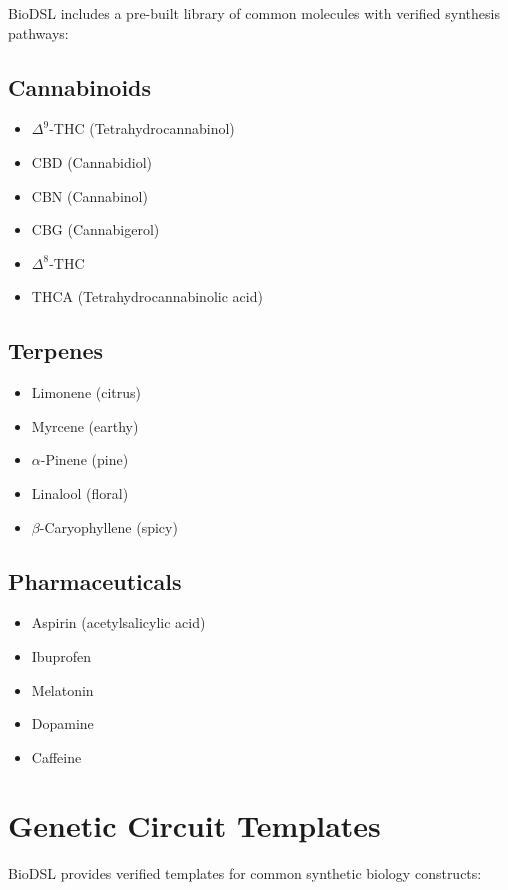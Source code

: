 \documentclass[12pt,a4paper]{article}
\begin{document}
BioDSL includes a pre-built library of common molecules with verified synthesis pathways:

\subsection{Cannabinoids}
\begin{itemize}
    \item $\Delta^9$-THC (Tetrahydrocannabinol)
    \item CBD (Cannabidiol)
    \item CBN (Cannabinol)
    \item CBG (Cannabigerol)
    \item $\Delta^8$-THC
    \item THCA (Tetrahydrocannabinolic acid)
\end{itemize}

\subsection{Terpenes}
\begin{itemize}
    \item Limonene (citrus)
    \item Myrcene (earthy)
    \item $\alpha$-Pinene (pine)
    \item Linalool (floral)
    \item $\beta$-Caryophyllene (spicy)
\end{itemize}

\subsection{Pharmaceuticals}
\begin{itemize}
    \item Aspirin (acetylsalicylic acid)
    \item Ibuprofen
    \item Melatonin
    \item Dopamine
    \item Caffeine
\end{itemize}

\section{Genetic Circuit Templates}

BioDSL provides verified templates for common synthetic biology constructs:
\end{document}
